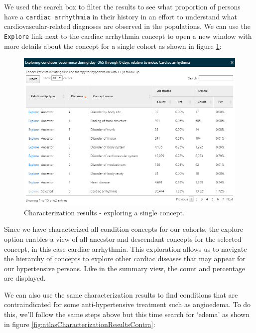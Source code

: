 \documentclass[11pt]{book}
\theoremstyle{definition}
\theoremstyle{definition}
\theoremstyle{definition}
\theoremstyle{remark}
\begin{document}
We used the search box to filter the results to see what proportion of persons have a \texttt{cardiac\ arrhythmia} in their history in an effort to understand what cardiovascular-related diagnoses are observed in the populations. We can use the \texttt{Explore} link next to the cardiac arrhythmia concept to open a new window with more details about the concept for a single cohort as shown in figure \ref{fig:atlasCharacterizationResultsExplore}:

\begin{figure}

{\centering \includegraphics[width=1\linewidth]{images/Characterization/atlasCharacterizationResultsExplore} 

}

\caption{Characterization results - exploring a single concept.}\label{fig:atlasCharacterizationResultsExplore}
\end{figure}

Since we have characterized all condition concepts for our cohorts, the explore option enables a view of all ancestor and descendant concepts for the selected concept, in this case cardiac arrhythmia. This exploration allows us to navigate the hierarchy of concepts to explore other cardiac diseases that may appear for our hypertensive persons. Like in the summary view, the count and percentage are displayed.

We can also use the same characterization results to find conditions that are contraindicated for some anti-hypertensive treatment such as angioedema. To do this, we'll follow the same steps above but this time search for `edema' as shown in figure \ref{fig:atlasCharacterizationResultsContra}:
\end{document}
